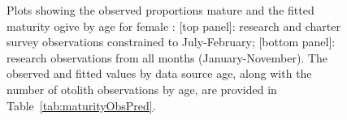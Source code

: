 \begin{figure}[htp]
\captionsetup[subfigure]{labelformat=empty}
\begin{center}
\newline
{}
\end{center}
\vspace{-8mm}
\caption{Plots showing the observed proportions mature and the fitted maturity ogive by age for female \fishname: [top panel]: research and charter survey observations constrained to July-February; [bottom panel]: research observations from all months (January-November). The observed and fitted values by data source age, along with the number of otolith observations by age, are provided in Table~\ref{tab:maturityObsPred}.}
\label{fig:maturityfit}
\end{figure}

